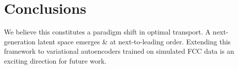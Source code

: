 \section{Conclusions}\label{sec:conclusions}

We believe this constitutes a paradigm shift in optimal transport. A
next-generation latent space emerges & at next-to-leading order. Extending
this framework to variational autoencoders trained on simulated FCC data
is an exciting direction for future work.

